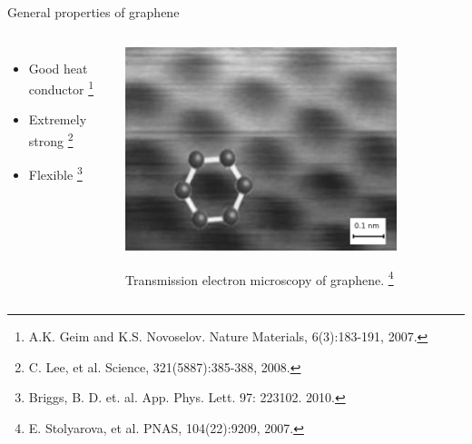 \documentclass{beamer}
\begin{document}
\begin{frame}

\vspace{-0.3cm}

\noindent\makebox[\linewidth]{\rule{\linewidth}{0.4pt}}

\vspace{-2.0mm}
\begin{center}
{\huge General properties of graphene}
\end{center}

\vspace{-6mm}
\noindent\makebox[\linewidth]{\rule{\linewidth}{0.4pt}}

\vfill

\begin{columns}

\begin{itemize}

\item Good heat conductor
\footnote[frame]{\tiny A.K. Geim and K.S. Novoselov. Nature
Materials, 6(3):183-191, 2007.}

\item Extremely strong
\footnote[frame]{\tiny C. Lee, et al. Science, 321(5887):385-388, 2008.}

\item Flexible
\footnote[frame]{\tiny Briggs, B. D. et. al. App. Phys. Lett. 97:
223102. 2010.}

\end{itemize}


\begin{center}
\includegraphics[width=0.8\textwidth]{figs/tem.png}

Transmission electron microscopy of graphene.
\footnote[frame]{\tiny E. Stolyarova, et al. PNAS, 104(22):9209, 2007.}
\end{center}



\end{columns}

\hspace{5mm}

\end{frame}
\end{document}

